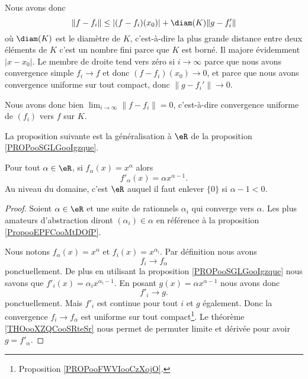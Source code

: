 \begin{normaltext}
\begin{subproof}
		Nous avons donc
		\begin{equation}
			\| f-f_i \|\leq | (f-f_i)(x_0) |+\diam(K)\| g-f'_i \|
		\end{equation}
		où \( \diam(K)\) est le diamètre de \( K\), c'est-à-dire la plus grande distance entre deux éléments de \( K\) c'est un nombre fini parce que \( K\) est borné. Il majore évidemment \( | x-x_0 |\). Le membre de droite tend vers zéro si \( i\to \infty\) parce que nous avons convergence simple \( f_i\to f\) et donc \( (f-f_i)(x_0)\to 0\), et parce que nous avons convergence uniforme sur tout compact, donc \( \| g-f_i' \|\to 0\).

		Nous avons donc bien \( \lim_{i\to \infty}\| f-f_i \|=0\), c'est-à-dire convergence uniforme de \( (f_i)\) vers \( f\) sur \( K\).

	\end{subproof}
\end{normaltext}

La proposition suivante est la généralisation à \( \eR\) de la proposition \ref{PROPooSGLGooIgzque}.
\begin{proposition}     \label{PROPooKIASooGngEDh}
	Pour tout \( \alpha\in \eR\), si \( f_{\alpha}(x)=x^{\alpha}\) alors
	\begin{equation}
		f'_{\alpha}(x)=\alpha x^{\alpha-1}.
	\end{equation}
	Au niveau du domaine, c'est \( \eR\) auquel il faut enlever \( \{ 0 \}\) si \( \alpha-1<0\).
\end{proposition}

\begin{proof}
	Soient \( \alpha\in \eR\) et une suite de rationnels \( \alpha_i\) qui converge vers \( \alpha\). Les plus amateurs d'abstraction diront \( (\alpha_i)\in \alpha\) en référence à la proposition \ref{PropooEPFCooMtDOfP}.

	Nous notons \( f_{\alpha}(x)=x^{\alpha}\) et \( f_i(x)=x^{\alpha_i}\). Par définition nous avons
	\begin{equation}
		f_i\to f_{\alpha}
	\end{equation}
	ponctuellement. De plus en utilisant la proposition \ref{PROPooSGLGooIgzque} nous savons que \( f'_i(x)=\alpha_i x^{\alpha_i-1}\). En posant \( g(x)=\alpha x^{\alpha-1}\) nous avons donc
	\begin{equation}
		f'_i\to g.
	\end{equation}
	ponctuellement. Mais \( f'_i\) est continue pour tout \( i\) et \( g\) également. Donc la convergence \( f_i\to f_{\alpha}\) est uniforme sur tout compact\footnote{Proposition \ref{PROPooFWVIooCzXojO}.}. Le théorème \ref{THOooXZQCooSRteSr} nous permet de permuter limite et dérivée pour avoir \( g=f'_{\alpha}\).
\end{proof}

